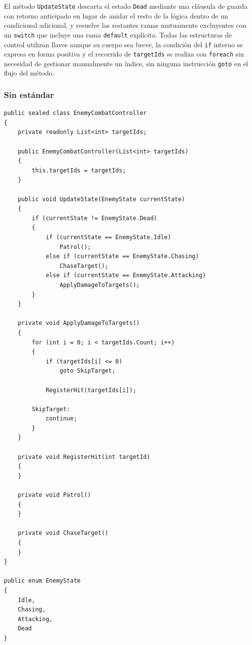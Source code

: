 El método \texttt{UpdateState} descarta el estado \texttt{Dead} mediante una cláusula de guarda con retorno anticipado en lugar de anidar el resto de la lógica dentro de un condicional adicional, y resuelve las restantes ramas mutuamente excluyentes con un \texttt{switch} que incluye una rama \texttt{default} explícita. Todas las estructuras de control utilizan llaves aunque su cuerpo sea breve, la condición del \texttt{if} interno se expresa en forma positiva y el recorrido de \texttt{targetIds} se realiza con \texttt{foreach} sin necesidad de gestionar manualmente un índice, sin ninguna instrucción \texttt{goto} en el flujo del método.

\subsubsection{Sin estándar}

\begin{lstlisting}[style=csharpstyle]
public sealed class EnemyCombatController
{
    private readonly List<int> targetIds;

    public EnemyCombatController(List<int> targetIds)
    {
        this.targetIds = targetIds;
    }

    public void UpdateState(EnemyState currentState)
    {
        if (currentState != EnemyState.Dead)
        {
            if (currentState == EnemyState.Idle)
                Patrol();
            else if (currentState == EnemyState.Chasing)
                ChaseTarget();
            else if (currentState == EnemyState.Attacking)
                ApplyDamageToTargets();
        }
    }

    private void ApplyDamageToTargets()
    {
        for (int i = 0; i < targetIds.Count; i++)
        {
            if (targetIds[i] <= 0)
                goto SkipTarget;

            RegisterHit(targetIds[i]);

        SkipTarget:
            continue;
        }
    }

    private void RegisterHit(int targetId)
    {
    }

    private void Patrol()
    {
    }

    private void ChaseTarget()
    {
    }
}

public enum EnemyState
{
    Idle,
    Chasing,
    Attacking,
    Dead
}
\end{lstlisting}

